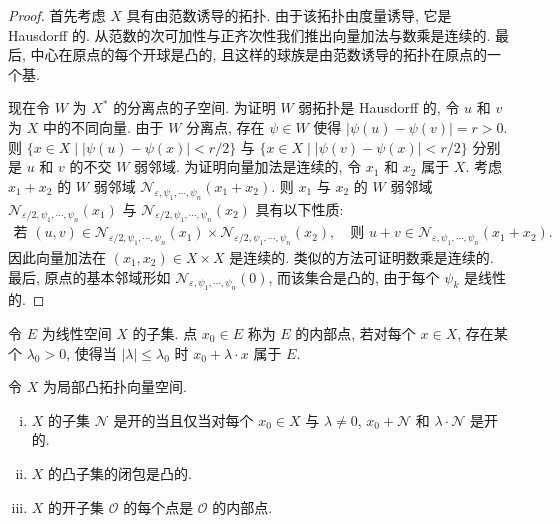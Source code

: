 \documentclass[../../main.tex]{subfiles}
\begin{document}
\begin{proof}
首先考虑 $X$ 具有由范数诱导的拓扑. 由于该拓扑由度量诱导, 它是 Hausdorff 的. 从范数的次可加性与正齐次性我们推出向量加法与数乘是连续的. 最后, 中心在原点的每个开球是凸的, 且这样的球族是由范数诱导的拓扑在原点的一个基.

现在令 $W$ 为 $X^{*}$ 的分离点的子空间. 为证明 $W$ 弱拓扑是 Hausdorff 的, 令 $u$ 和 $v$ 为 $X$ 中的不同向量. 由于 $W$ 分离点, 存在 $\psi\in W$ 使得 $|\psi(u)-\psi(v)|=r>0$. 则 $\{x\in X\mid|\psi(u)-\psi(x)|<r/2\}$ 与 $\{x\in X\mid|\psi(v)-\psi(x)|<r/2\}$ 分别是 $u$ 和 $v$ 的不交 $W$ 弱邻域. 为证明向量加法是连续的, 令 $x_{1}$ 和 $x_{2}$ 属于 $X$. 考虑 $x_{1}+x_{2}$ 的 $W$ 弱邻域 $\mathcal{N}_{\varepsilon,\psi_{1},\cdots,\psi_{n}}(x_{1}+x_{2})$. 则 $x_{1}$ 与 $x_{2}$ 的 $W$ 弱邻域 $\mathcal{N}_{\varepsilon/2,\psi_{1},\cdots,\psi_{n}}(x_{1})$ 与 $\mathcal{N}_{\varepsilon/2,\psi_{1},\cdots,\psi_{n}}(x_{2})$ 具有以下性质:
\begin{align*}
\text{若 }(u,v)\in\mathcal{N}_{\varepsilon/2,\psi_{1},\cdots,\psi_{n}}(x_{1})\times\mathcal{N}_{\varepsilon/2,\psi_{1},\cdots,\psi_{n}}(x_{2}),\quad\text{则 }u+v\in\mathcal{N}_{\varepsilon,\psi_{1},\cdots,\psi_{n}}(x_{1}+x_{2}).
\end{align*}
因此向量加法在 $(x_{1},x_{2})\in X\times X$ 是连续的. 类似的方法可证明数乘是连续的. 最后, 原点的基本邻域形如 $\mathcal{N}_{\varepsilon,\psi_{1},\cdots,\psi_{n}}(0)$, 而该集合是凸的, 由于每个 $\psi_{k}$ 是线性的.
\end{proof}

\begin{definition}[内部点]\label{definition:ch14-内部点}
令 $E$ 为线性空间 $X$ 的子集. 点 $x_{0}\in E$ 称为 $E$ 的内部点, 若对每个 $x\in X$, 存在某个 $\lambda_{0}>0$, 使得当 $|\lambda|\leqslant\lambda_{0}$ 时 $x_{0}+\lambda\cdot x$ 属于 $E$.
\end{definition}

\begin{proposition}\label{proposition:ch14-局部凸性质}
令 $X$ 为局部凸拓扑向量空间.
\begin{enumerate}[(i)]
\item $X$ 的子集 $\mathcal{N}$ 是开的当且仅当对每个 $x_{0}\in X$ 与 $\lambda\neq 0$, $x_{0}+\mathcal{N}$ 和 $\lambda\cdot\mathcal{N}$ 是开的.
\item $X$ 的凸子集的闭包是凸的.
\item $X$ 的开子集 $\mathcal{O}$ 的每个点是 $\mathcal{O}$ 的内部点.
\end{enumerate}
\end{proposition}
\end{document}
